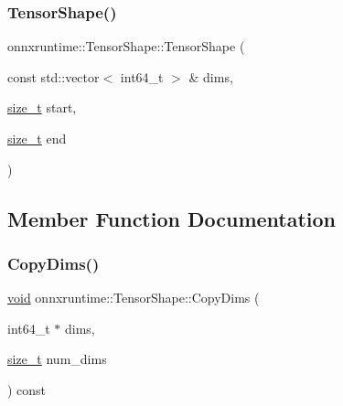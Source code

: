 \mbox{\label{classonnxruntime_1_1TensorShape_a4ae80dbb6c8da7a2cb796d25c0e5bf4d}} 
\subsubsection{\texorpdfstring{Tensor\+Shape()}{TensorShape()}\hspace{0.1cm}{\footnotesize\ttfamily [6/6]}}
{\footnotesize\ttfamily onnxruntime\+::\+Tensor\+Shape\+::\+Tensor\+Shape (\begin{DoxyParamCaption}\item[{const std\+::vector$<$ int64\+\_\+t $>$ \&}]{dims,  }\item[{\mbox{\hyperlink{mlasi_8h_a503efbc1c6e50825320ad909366b78ab}{size\+\_\+t}}}]{start,  }\item[{\mbox{\hyperlink{mlasi_8h_a503efbc1c6e50825320ad909366b78ab}{size\+\_\+t}}}]{end }\end{DoxyParamCaption})}



\subsection{Member Function Documentation}
\mbox{\label{classonnxruntime_1_1TensorShape_a43fc07106b872f36ed139e0a20b94818}} 
\subsubsection{\texorpdfstring{Copy\+Dims()}{CopyDims()}}
{\footnotesize\ttfamily \mbox{\hyperlink{mlasi_8h_a88f941d423cb2a819b70a1358982b1a6}{void}} onnxruntime\+::\+Tensor\+Shape\+::\+Copy\+Dims (\begin{DoxyParamCaption}\item[{int64\+\_\+t $\ast$}]{dims,  }\item[{\mbox{\hyperlink{mlasi_8h_a503efbc1c6e50825320ad909366b78ab}{size\+\_\+t}}}]{num\+\_\+dims }\end{DoxyParamCaption}) const\hspace{0.3cm}{\ttfamily [inline]}}

